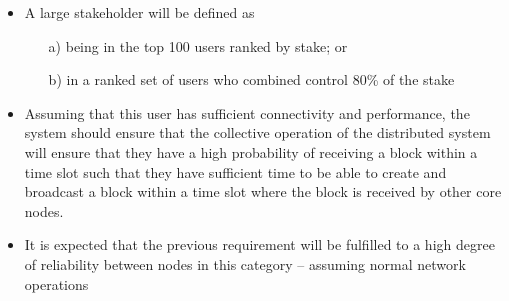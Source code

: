 \documentclass{report}
\theoremstyle{definition}{
  \newtheorem{lemma}{Lemma}[section] %
  \newtheorem{definition}[lemma]{Definition}
}
\theoremstyle{theorem}{
  \newtheorem{invariant}[lemma]{Invariant}
  \newtheorem{proofobligation}[lemma]{Proof Obligation}
}
\numberwithin{equation}{lemma}
\begin{document}
\begin{itemize}
\item A large stakeholder will be defined as
      \begin{itemize}
      \item[a)] being in the top 100 users ranked by stake; or
      \item[b)] in a ranked set of users who combined control 80\% of the stake
      \end{itemize}
\item Assuming that this user has sufficient connectivity and performance, the
      system should ensure that the collective operation of the distributed
      system will ensure that they have a high probability of receiving a
      block within a time slot such that they have sufficient time to be able
      to create and broadcast a block within a time slot where the block is
      received by other core nodes.
\item It is expected that the previous requirement will be fulfilled to a high
      degree of reliability between nodes in this category -- assuming normal
      network operations


\end{itemize}
\end{document}
